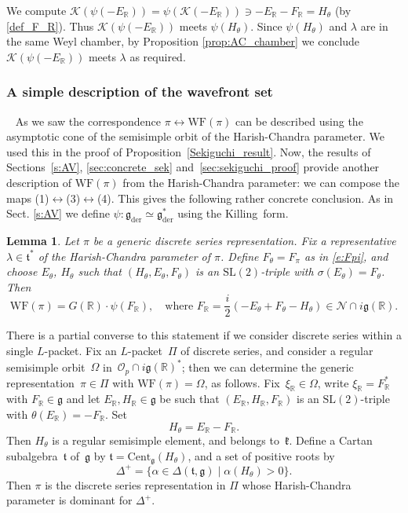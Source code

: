 \documentclass[cupthm]{CUP-JNL-JMJ}
\numberwithin{equation}{section}
\theoremstyle{cupplain}
\newtheorem{lemma}[theorem]{Lemma}
\theoremstyle{cupdefinition}
\theoremstyle{cupremark}
\theoremstyle{cupproof}
\newcommand{\Cent}{\mathrm{Cent}}
\renewcommand{\O}{\mathcal O}
\newcommand{\R}{\mathbb R}
\newcommand{\N}{\mathcal N}
\newcommand{\K}{\mathcal K}
\renewcommand{\k}{\mathfrak k}
\renewcommand{\t}{\mathfrak t}
\newcommand{\g}{\mathfrak g}
\newcommand{\gder}{\mathfrak g_{\mathrm{der}}}
\newcommand{\WF}{\mathrm{WF}}
\newcommand{\Op}{\O_p}
\begin{document}
We compute $\K(\psi(-E_\R))=\psi(\K(-E_\R))\ni -E_\R-F_\R=H_\theta$ (by \eqref{def_F_R}).
Thus $\K(\psi(-E_\R))$ meets $\psi(H_\theta)$. 
Since  $\psi(H_{\theta})$ and $\lambda$ are in the same Weyl chamber, by Proposition \ref{prop:AC_chamber} we conclude 
$\K(\psi(-E_\R))$ meets $\lambda$ as required.

\subsubsection{A simple description of the wavefront set}\label{sec:alternate_WF}~
As we saw the correspondence \mbox{$\pi \leftrightarrow \WF(\pi)$} can be described using the asymptotic cone of the semisimple orbit of the Harish-Chandra parameter. We used this in the proof of Proposition~\ref{Sekiguchi_result}. Now, the results of Sections~\ref{s:AV}, \ref{sec:concrete_sek} and~\ref{sec:sekiguchi_proof} provide another description of $\WF(\pi)$ from the Harish-Chandra parameter: we can compose the maps (1)$\leftrightarrow$(3)$\leftrightarrow$(4). This gives the following rather concrete conclusion.
As in Sect. \ref{s:AV} we define $\psi:\gder\simeq \gder^*$ using the Killing~form.  

\begin{lemma}\label{lem:explicit_WF}
  Let $\pi$ be a generic discrete series representation. Fix a representative  $\lambda\in \t^*$ of the Harish-Chandra parameter of $\pi$.
Define $F_\theta=F_\pi$ as in \eqref{e:Fpi}, and choose  $E_\theta$, $H_\theta$ such that $(H_\theta,E_\theta,F_\theta)$ is an $\mathrm{SL}(2)$-triple with $\sigma(E_\theta)=F_\theta$.  Then
$$
\WF(\pi)=G(\R)\cdot \psi(F_\R), \quad \text{where $F_\R = \frac i2(-E_\theta+F_\theta-H_\theta)\in\N\cap i\g(\R)$.}
$$\end{lemma}
There is a partial converse to this statement if we consider discrete series within a single $L$-packet. Fix an $L$-packet~$\Pi$ of discrete series, and consider a regular semisimple orbit~$\Omega$ in~$\Op \cap i\g(\R)^\ast$; then we can determine the generic representation~$\pi \in \Pi$ with $\WF(\pi)=\Omega$, as follows. Fix~$\xi_\R \in \Omega$, write $\xi_\R=F_\R^\ast$ with $F_\R \in \g$ and let $E_\R, H_\R \in \g$ be such that $(E_\R, H_\R, F_\R)$ is an  $\mathrm{SL}(2)$-triple with $\theta(E_\R)=-F_\R$. Set
$$
H_\theta=E_\R-F_\R.
$$
Then $H_\theta$ is a regular semisimple element, and belongs to~$\k$.
Define a Cartan subalgebra~$\t$ of~$\g$ by $\t=\Cent_{\g}(H_\theta)$, and a set of positive roots by
$$
\Delta^+=\{\alpha\in\Delta(\t,\g)\mid  \alpha(H_\theta)>0\}.
$$
Then $\pi$ is the discrete series representation in $\Pi$ whose Harish-Chandra parameter is dominant for $\Delta^+$. 
\end{document}
